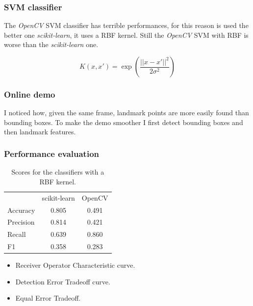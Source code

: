 \documentclass{beamer}
\begin{document}
\begin{frame}
    \frametitle{SVM classifier}
    The \textit{OpenCV} SVM classifier has terrible performances, for this reason is used the better one \textit{scikit-learn}, it uses a RBF kernel.
    Still the \textit{OpenCV} SVM with RBF is worse than the \textit{scikit-learn} one.

    \begin{equation}
        K(x,x') = \exp \left(\frac{||x-x'||^2}{2\sigma^2}\right)
    \end{equation}
\end{frame}

\begin{frame}
    \frametitle{Online demo}
    I noticed how, given the same frame, landmark points are more easily found than bounding boxes. 
    To make the demo smoother I first detect bounding boxes and then landmark features.
\end{frame}

\begin{frame}
    \frametitle{Performance evaluation}

    \begin{table}[h!t]
        \centering
        \caption{Scores for the classifiers with a RBF kernel.}
        \label{tab:scores}
        \begin{tabular}{lcc}
            & scikit-learn & OpenCV \\
            Accuracy & 0.805 & 0.491 \\
            Precision & 0.814 & 0.421 \\
            Recall & 0.639 & 0.860 \\
            F1 & 0.358 & 0.283 \\
        \end{tabular}
    \end{table}

    \begin{itemize}
        \item Receiver Operator Characteristic curve.
        \item Detection Error Tradeoff curve.
        \item Equal Error Tradeoff.
    \end{itemize}

\end{frame}
\end{document}
